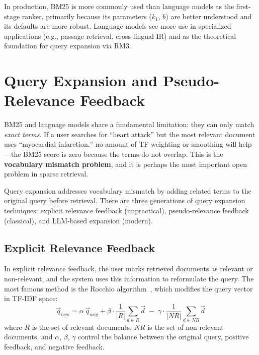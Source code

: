 \documentclass[11pt,a4paper]{article}
\theoremstyle{definition}
\theoremstyle{plain}
\begin{document}
\begin{production}
In production, BM25 is more commonly used than language models as the first-stage ranker, primarily because its parameters ($k_1$, $b$) are better understood and its defaults are more robust. Language models see more use in specialized applications (e.g., passage retrieval, cross-lingual IR) and as the theoretical foundation for query expansion via RM3.
\end{production}



\section{Query Expansion and Pseudo-Relevance Feedback}
\label{sec:qe}

BM25 and language models share a fundamental limitation: they can only match \emph{exact terms}. If a user searches for ``heart attack'' but the most relevant document uses ``myocardial infarction,'' no amount of TF weighting or smoothing will help---the BM25 score is zero because the terms do not overlap. This is the \textbf{vocabulary mismatch problem}, and it is perhaps the most important open problem in sparse retrieval.

Query expansion addresses vocabulary mismatch by adding related terms to the original query before retrieval. There are three generations of query expansion techniques: explicit relevance feedback (impractical), pseudo-relevance feedback (classical), and LLM-based expansion (modern).

\subsection{Explicit Relevance Feedback}

In explicit relevance feedback, the user marks retrieved documents as relevant or non-relevant, and the system uses this information to reformulate the query. The most famous method is the Rocchio algorithm~\cite{rocchio1971relevance}, which modifies the query vector in TF-IDF space:
\begin{equation}
\vec{q}_\text{new} = \alpha\,\vec{q}_\text{orig} + \beta \cdot \frac{1}{|R|}\sum_{d \in R}\vec{d} \;-\; \gamma \cdot \frac{1}{|NR|}\sum_{d \in NR}\vec{d}
\end{equation}
where $R$ is the set of relevant documents, $NR$ is the set of non-relevant documents, and $\alpha$, $\beta$, $\gamma$ control the balance between the original query, positive feedback, and negative feedback.
\end{document}
